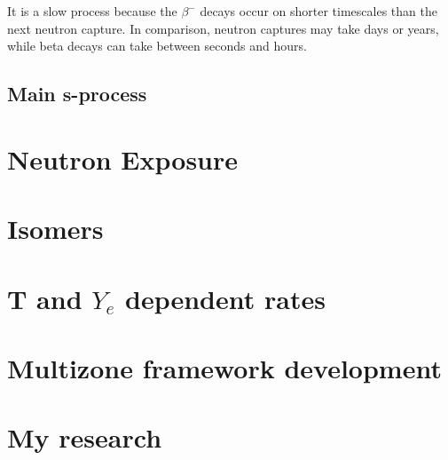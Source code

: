 \documentclass{article}
\begin{document}
\noindent It is a slow process because the $\beta^{-}$ decays occur on shorter timescales than the next neutron capture. In comparison, 
neutron captures may take days or years, while beta decays can take between seconds and hours.

\subsection*{Main s-process}


\section*{Neutron Exposure}
\section*{Isomers}
\section*{T and $Y_{e}$ dependent rates}
\section*{Multizone framework development}
\section*{My research}

\singlespacing



\end{document}
